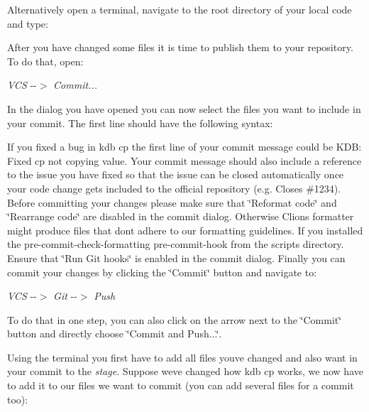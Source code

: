 Alternatively open a terminal, navigate to the root directory of your local code and type\+:


\begin{DoxyCode}{0}
\end{DoxyCode}


After you have changed some files it is time to publish them to your repository. To do that, open\+:

{\itshape V\+CS} -\/-\/$>$ {\itshape Commit...}

In the dialog you have opened you can now select the files you want to include in your commit. The first line should have the following syntax\+:


\begin{DoxyCode}{0}
\end{DoxyCode}


If you fixed a bug in {\ttfamily kdb cp} the first line of your commit message could be {\ttfamily K\+DB\+: Fixed cp not copying value}. Your commit message should also include a reference to the issue you have fixed so that the issue can be closed automatically once your code change gets included to the official repository (e.\+g. {\ttfamily Closes \#1234}). Before committing your changes please make sure that \char`\"{}\+Reformat code\char`\"{} and \char`\"{}\+Rearrange code\char`\"{} are disabled in the commit dialog. Otherwise Clions formatter might produce files that don\textquotesingle{}t adhere to our formatting guidelines. If you installed the {\ttfamily pre-\/commit-\/check-\/formatting} pre-\/commit-\/hook from the {\ttfamily scripts} directory. Ensure that \char`\"{}\+Run Git hooks\char`\"{} is enabled in the commit dialog. Finally you can commit your changes by clicking the \char`\"{}\+Commit\char`\"{} button and navigate to\+:

{\itshape V\+CS} -\/-\/$>$ {\itshape Git} -\/-\/$>$ {\itshape Push}

To do that in one step, you can also click on the arrow next to the \char`\"{}\+Commit\char`\"{} button and directly choose \char`\"{}\+Commit and Push...\char`\"{}.

Using the terminal you first have to add all files you\textquotesingle{}ve changed and also want in your commit to the {\itshape stage}. Suppose we\textquotesingle{}ve changed how {\ttfamily kdb cp} works, we now have to add it to our files we want to commit (you can add several files for a commit too)\+:



